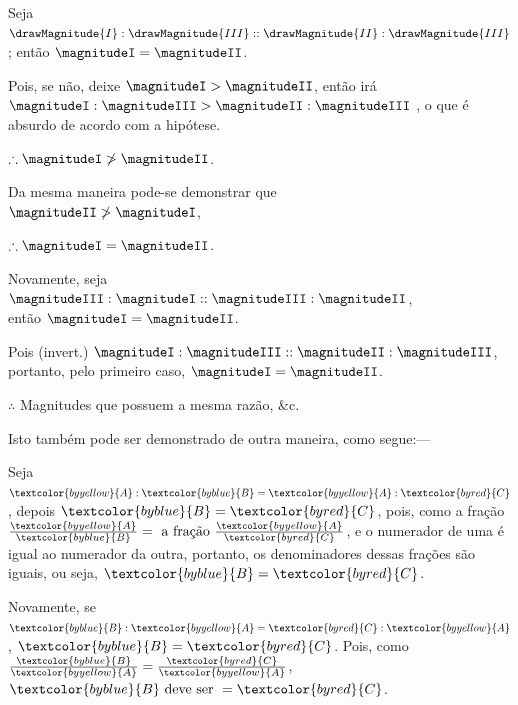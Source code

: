 \documentclass[booklanguage=brazilian]{byrnebook}
\begin{document}
\vfill\pagebreak

\label{prop:V.IX}

\begin{center}
Seja $\drawMagnitude{I} : \drawMagnitude{III} :: \drawMagnitude{II} : \drawMagnitude{III}$; então $\magnitudeI = \magnitudeII$.

Pois, se não, deixe $\magnitudeI > \magnitudeII$, então irá\\
$\magnitudeI : \magnitudeIII > \magnitudeII : \magnitudeIII$ ,
o que é absurdo de acordo com a hipótese.

$\therefore \magnitudeI \ngtr \magnitudeII$. %

Da mesma maneira pode-se demonstrar que\\
$\magnitudeII \ngtr \magnitudeI$, %

$\therefore \magnitudeI = \magnitudeII$.

Novamente, seja $\magnitudeIII : \magnitudeI :: \magnitudeIII : \magnitudeII$,\\
então $\magnitudeI = \magnitudeII$.

Pois (invert.) $\magnitudeI : \magnitudeIII :: \magnitudeII : \magnitudeIII$,\\
portanto, pelo primeiro caso, $\magnitudeI = \magnitudeII$.

$\therefore$ Magnitudes que possuem a mesma razão, \&c.
\end{center}

Isto também pode ser demonstrado de outra maneira, como segue:—

Seja $\textcolor{byyellow}{A} : \textcolor{byblue}{B} = \textcolor{byyellow}{A} : \textcolor{byred}{C}$, depois $\textcolor{byblue}{B} = \textcolor{byred}{C}$, pois, como a fração $\frac{\textcolor{byyellow}{A}}{\textcolor{byblue}{B}} = \mbox{ a fração } \frac{\textcolor{byyellow}{A}}{\textcolor{byred}{C}}$, e o numerador de uma é igual ao numerador da outra, portanto, os denominadores dessas frações são iguais, ou seja, $\textcolor{byblue}{B} = \textcolor{byred}{C}$.

Novamente, se $\textcolor{byblue}{B} : \textcolor{byyellow}{A} = \textcolor{byred}{C} : \textcolor{byyellow}{A}$, $\textcolor{byblue}{B} = \textcolor{byred}{C}$. Pois, como $\frac{\textcolor{byblue}{B}}{\textcolor{byyellow}{A}} = \frac{\textcolor{byred}{C}}{\textcolor{byyellow}{A}}$, $\textcolor{byblue}{B} \mbox{ deve ser } = \textcolor{byred}{C}$.
\end{document}
